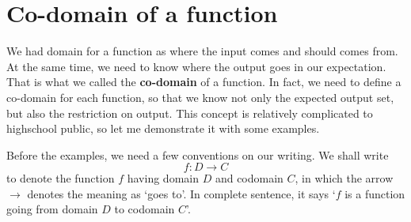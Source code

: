 \documentclass[12pt]{article}
\begin{document}
    \section*{Co-domain of a function}
    We had domain for a function as where the input comes and should comes from. At the same time, we need to know where the output goes in our expectation. That is what we called the \textbf{co-domain} of a function. In fact, we need to define a co-domain for each function, so that we know not only the expected output set, but also the restriction on output. This concept is relatively complicated to highschool public, so let me demonstrate it with some examples.

    Before the examples, we need a few conventions on our writing. We shall write $$f:D\to C$$ to denote the function $f$ having domain $D$ and codomain $C$, in which the arrow $\to$ denotes the meaning as `goes to'. In complete sentence, it says `$f$ is a function going from domain $D$ to codomain $C$'.
\end{document}
